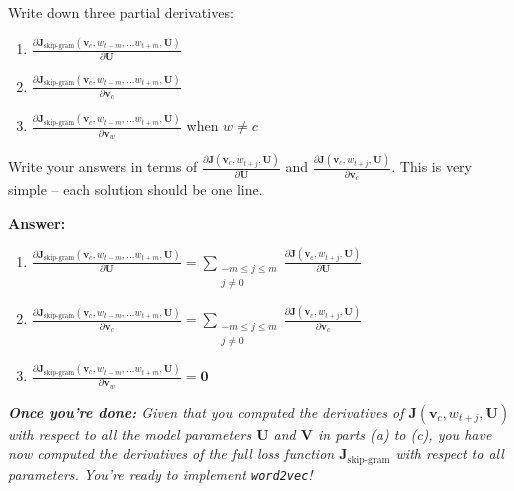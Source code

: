 \documentclass{article}
\newenvironment{answer}{
    {\bf Answer:} \sf \begingroup\color{red}
}{\endgroup}%
\begin{document}
\begin{enumerate}[label=(\alph*)]
Write down three partial derivatives: 
\begin{enumerate}[label=(\roman*)]
    \item ${\frac{\partial \bm J_{\textrm{skip-gram}}(\bm v_c, w_{t-m},\ldots w_{t+m}, \bm U)} {\partial \bm U}}$
    \item ${\frac{\partial \bm J_{\textrm{skip-gram}}(\bm v_c, w_{t-m},\ldots w_{t+m}, \bm U)} {\partial \bm v_c}}$
    \item ${\frac{\partial \bm J_{\textrm{skip-gram}}(\bm v_c, w_{t-m},\ldots w_{t+m}, \bm U)} {\partial \bm v_w}}$ when $w \ne c$
\end{enumerate}
Write your answers in terms of ${\frac{\partial \bm J(\bm v_c, w_{t+j}, \bm U)}{\partial \bm U}}$ and ${\frac{\partial \bm J(\bm v_c, w_{t+j}, \bm U)}{\partial \bm v_c}}$. This is very simple -- each solution should be one line.

\begin{shaded}
\begin{answer}
\begin{enumerate}[label=(\roman*)]
\renewcommand{\theequation}{\roman{equation}}%
\item ${\frac{\partial \bm J_{\textrm{skip-gram}}(\bm v_c, w_{t-m},\ldots w_{t+m}, \bm U)} {\partial \bm U}} = \sum_{\substack{-m\le j \le m \\ j\ne 0}} {\frac{\partial \bm J(\bm v_c, w_{t+j}, \bm U)}{\partial \bm U}}$
\item ${\frac{\partial \bm J_{\textrm{skip-gram}}(\bm v_c, w_{t-m},\ldots w_{t+m}, \bm U)} {\partial \bm v_c}} = \sum_{\substack{-m\le j \le m \\ j\ne 0}} {\frac{\partial \bm J(\bm v_c, w_{t+j}, \bm U)}{\partial \bm v_c}}$
\item ${\frac{\partial \bm J_{\textrm{skip-gram}}(\bm v_c, w_{t-m},\ldots w_{t+m}, \bm U)} {\partial \bm v_w}} = \bm 0$
\end{enumerate}
\end{answer}
\end{shaded}

\textit{\textbf{Once you're done:} Given that you computed the derivatives of $\bm J(\bm v_c, w_{t+j}, \bm U)$ with respect to all the model parameters $\bm U$ and $\bm V$ in parts (a) to (c), you have now computed the derivatives of the full loss function $\bm J_{\text{skip-gram}}$ with respect to all parameters. You're ready to implement \texttt{word2vec}!} %

\end{enumerate}
\end{document}
